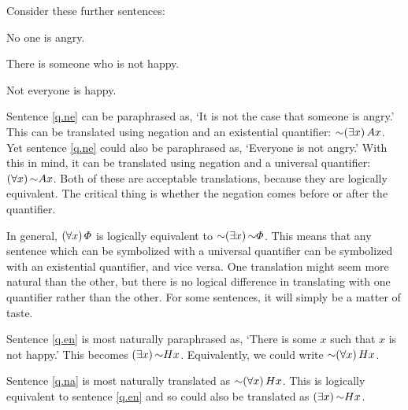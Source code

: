 Consider these further sentences:
\begin{earg}
\item[\ex{q.ne}] No one is angry.
\item[\ex{q.en}] There is someone who is not happy.
\item[\ex{q.na}] Not everyone is happy.
\end{earg}

Sentence \ref{q.ne} can be paraphrased as, `It is not the case that someone is angry.' This can be translated using negation and an existential quantifier: $\enot \qt{\exists}{x} Ax$. Yet sentence \ref{q.ne} could also be paraphrased as, `Everyone is not angry.' With this in mind, it can be translated using negation and a universal quantifier: $\qt{\forall}{x} \enot Ax$. Both of these are acceptable translations, because they are logically equivalent. The critical thing is whether the negation comes before or after the quantifier.

In general, $(\forall x) \,\varPhi{}$ is logically equivalent to $\enot\qt{\exists}{x}\enot\metaA{}$. This means that any sentence which can be symbolized with a universal quantifier can be symbolized with an existential quantifier, and vice versa. One translation might seem more natural than the other, but there is no logical difference in translating with one quantifier rather than the other. For some sentences, it will simply be a matter of taste.

Sentence \ref{q.en} is most naturally paraphrased as, `There is some $x$ such that $x$ is not happy.' This becomes $\qt{\exists}{x} \enot Hx$. Equivalently, we could write $\enot\qt{\forall}{x} Hx$.

Sentence \ref{q.na} is most naturally translated as $\enot\qt{\forall}{x} Hx$. This is logically equivalent to sentence \ref{q.en} and so could also be translated as $\qt{\exists}{x} \enot Hx$.



